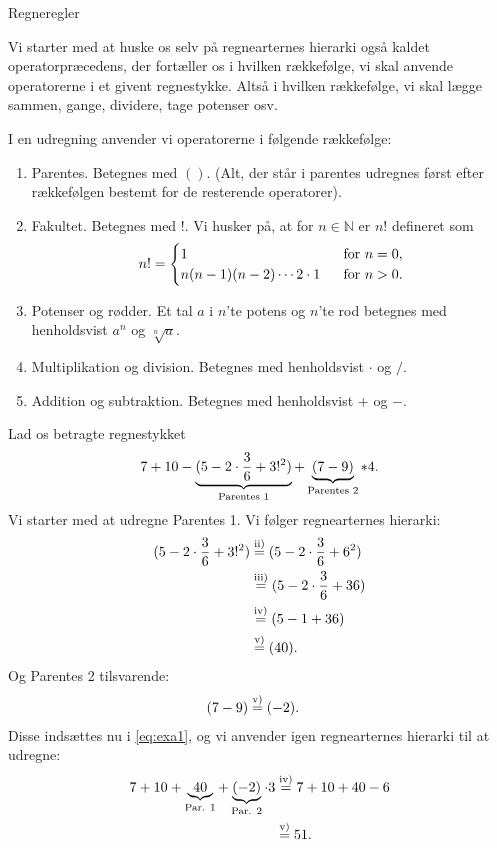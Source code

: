 
\begin{center}
\Huge
Regneregler
\end{center}
Vi starter med at huske os selv på regnearternes hierarki også kaldet operatorpræcedens, der fortæller os i hvilken rækkefølge, vi skal anvende operatorerne i et givent regnestykke. Altså i hvilken rækkefølge, vi skal lægge sammen, gange, dividere, tage potenser osv. 
\begin{defn}
I en udregning anvender vi operatorerne i følgende rækkefølge:
\begin{enumerate}[label=\roman*)]
\item Parentes. Betegnes med $()$. (Alt, der står i parentes udregnes først efter rækkefølgen bestemt for de resterende operatorer).
\item Fakultet. Betegnes med $!$. Vi husker på, at for $n\in \mathbb{N}$ er $n!$ defineret som 
\begin{align*}
n! = \begin{cases}
1 \ &\textnormal{ for }n=0,\\
n(n-1)(n-2)\cdots 2\cdot 1 \ &\textnormal{ for }n>0.
\end{cases}
\end{align*}
\item Potenser og rødder. Et tal $a$ i $n$'te potens og $n$'te rod betegnes med henholdsvist $a^n$ og $\sqrt[n]{a}$.
\item Multiplikation og division. Betegnes med henholdsvist $\cdot$ og $/$.
\item Addition og subtraktion. Betegnes med henholdsvist $+$ og $-$.
\end{enumerate}
\end{defn} 
\begin{exa}
Lad os betragte regnestykket
\begin{align}\label{eq:exa1}
7+10-\underbrace{(5-2\cdot \frac{3}{6}+3!^2)}_{\textnormal{Parentes 1}}+\underbrace{(7-9)}_{\textnormal{Parentes 2}}*4.
\end{align}
Vi starter med at udregne Parentes 1. Vi følger regnearternes hierarki:
\begin{align*}
(5-2\cdot \frac{3}{6}+3!^2) &\overset{\textnormal{ii)}}{=} (5-2\cdot \frac{3}{6}+6^2)\\
							&\overset{\textnormal{iii)}}{=} (5-2\cdot \frac{3}{6}+36)\\
							&\overset{\textnormal{iv)}}{=} (5-1+36)\\
							&\overset{\textnormal{v)}}{=} (40).
\end{align*}
Og Parentes 2 tilsvarende:
\begin{align*}
(7-9) &\overset{\textnormal{v)}}{=} (-2).
\end{align*}
Disse indsættes nu i \eqref{eq:exa1}, og vi anvender igen regnearternes hierarki til at udregne:
\begin{align*}
7+10+\underbrace{40}_{\textnormal{Par. 1}} + \underbrace{(-2)}_{\textnormal{Par. 2}}\cdot 3 &\overset{\textnormal{iv)}}{=} 7+10+40 -6 \\
&\overset{\textnormal{v)}}{=} 51.
\end{align*}
\end{exa}
